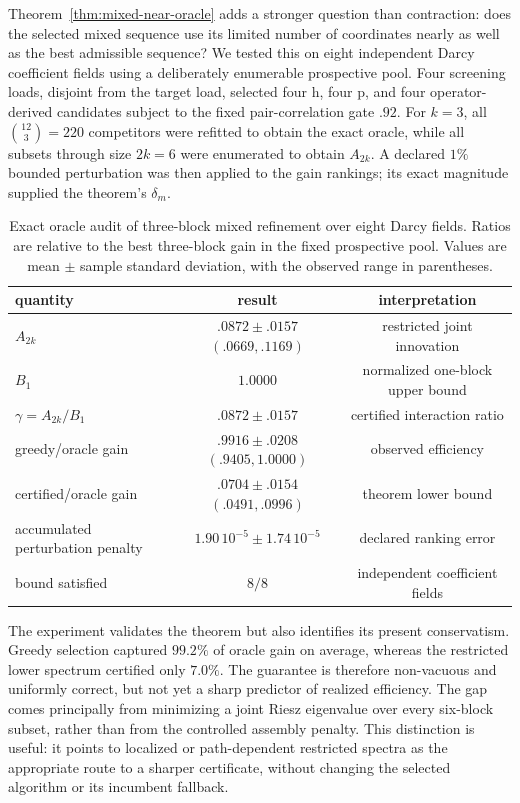 \documentclass[11pt]{article}
\numberwithin{algorithm}{section}
\theoremstyle{definition}\newtheorem{definition}[theorem]{Definition}
\theoremstyle{remark}\newtheorem{remark}[theorem]{Remark}
\begin{document}
Theorem~\ref{thm:mixed-near-oracle} adds a stronger question than contraction:
does the selected mixed sequence use its limited number of coordinates nearly
as well as the best admissible sequence?  We tested this on eight independent
Darcy coefficient fields using a deliberately enumerable prospective pool.
Four screening loads, disjoint from the target load, selected four h, four p,
and four operator-derived candidates subject to the fixed pair-correlation
gate $.92$.  For $k=3$, all $\binom{12}{3}=220$ competitors were refitted to
obtain the exact oracle, while all subsets through size $2k=6$ were enumerated
to obtain $A_{2k}$.  A declared $1\%$ bounded perturbation was then applied to
the gain rankings; its exact magnitude supplied the theorem's $\delta_m$.

\begin{table}[H]
\centering
\caption{Exact oracle audit of three-block mixed refinement over eight Darcy
fields.  Ratios are relative to the best three-block gain in the fixed
prospective pool.  Values are mean $\pm$ sample standard deviation, with the
observed range in parentheses.}
\label{tab:mixed-near-oracle-audit}
\begin{tabular}{lcc}
\toprule
quantity & result & interpretation\\
\midrule
$A_{2k}$ & $.0872\pm.0157$ $(.0669,.1169)$ & restricted joint innovation\\
$B_1$ & $1.0000$ & normalized one-block upper bound\\
$\gamma=A_{2k}/B_1$ & $.0872\pm.0157$ & certified interaction ratio\\
greedy/oracle gain & $.9916\pm.0208$ $(.9405,1.0000)$ & observed efficiency\\
certified/oracle gain & $.0704\pm.0154$ $(.0491,.0996)$ & theorem lower bound\\
accumulated perturbation penalty & $1.90\,10^{-5}\pm1.74\,10^{-5}$ & declared ranking error\\
bound satisfied & $8/8$ & independent coefficient fields\\
\bottomrule
\end{tabular}
\end{table}

The experiment validates the theorem but also identifies its present
conservatism.  Greedy selection captured $99.2\%$ of oracle gain on average,
whereas the restricted lower spectrum certified only $7.0\%$.  The guarantee
is therefore non-vacuous and uniformly correct, but not yet a sharp predictor
of realized efficiency.  The gap comes principally from minimizing a joint
Riesz eigenvalue over every six-block subset, rather than from the controlled
assembly penalty.  This distinction is useful: it points to localized or
path-dependent restricted spectra as the appropriate route to a sharper
certificate, without changing the selected algorithm or its incumbent
fallback.
\end{document}
